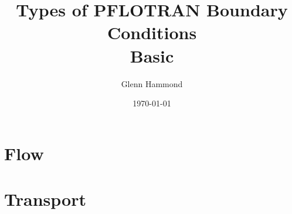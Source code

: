 \documentclass{beamer}
\title{Types of PFLOTRAN Boundary Conditions\\ Basic}
\author{Glenn Hammond}
\date{\today}
\begin{document}
\frame{\titlepage}

\section{Flow}

\section{Transport}

\end{document}
